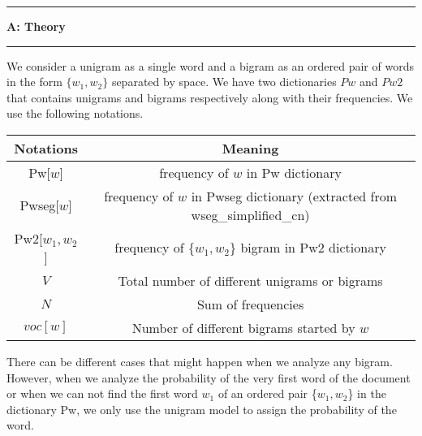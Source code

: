 \documentclass[11pt]{article}
\newcommand\question[2]{\vspace{.25in}\hrule\textbf{#1: #2}\vspace{.5em}\hrule\vspace{.10in}}
\begin{document}
\newcommand\NAME{Turash and Luiz}  %
\newcommand\ID{tmosharr \& lperesde}     %
\newcommand\HWNUM{}              %




\question{A}{Theory} 
We consider a unigram as a single word and a bigram as an ordered pair of words in the form $\{w_1,w_2\}$ separated by space.  We have two dictionaries $Pw$ and $Pw2$ that contains unigrams and bigrams respectively along with their frequencies. We use the following notations. 
\begin{table}[h]
	\vspace{-4pt}
	\centering
	\renewcommand\arraystretch{1.25}
	\begin{tabular}{|c|c|}
		\hline
		Notations   & Meaning  \\
		\hline
		Pw[$w$] & frequency of $w$ in Pw dictionary    \\
		\hline
		Pwseg[$w$] & frequency of $w$ in Pwseg dictionary (extracted from wseg\_simplified\_cn)   \\
		\hline
		Pw2[$w_1,w_2$] & frequency of \{$w_1,w_2$\} bigram in Pw2 dictionary    \\
		\hline
		$V$ & Total number of different unigrams or bigrams  \\
		\hline
		$N$ & Sum of frequencies  \\
		\hline
		$voc[w]$ & Number of different bigrams started by $w$\\
		\hline
	\end{tabular}
	\vspace{-6pt}
\end{table}   



There can be different cases that might happen when we analyze any bigram. However, when we analyze the probability of the very first word of the document or when we can not find the first word $w_1$ of an ordered pair \{$w_1,w_2$\} in the dictionary Pw, we only use the unigram model to assign the probability of the word.
\end{document}

